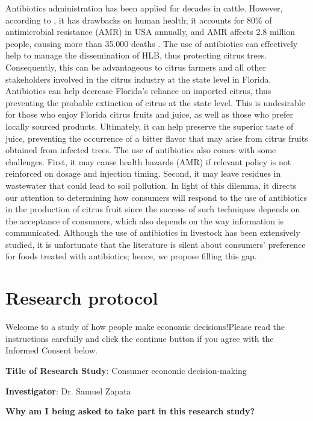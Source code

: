 \documentclass[12pt]{article}
\begin{document}
Antibiotics administration has been applied for decades in cattle. However, according to \citet{hosain_antimicrobial_2021}, it has drawbacks on human health; it accounts for 80\% of antimicrobial resistance (AMR) in USA annually, and AMR affects 2.8 million people, causing more than 35.000 deaths \citep{cdc2019antibiotic}.  The use of antibiotics can effectively help to manage the dissemination of HLB, thus protecting citrus trees. Consequently, this can be advantageous to citrus farmers and all other stakeholders involved in the citrus industry at the state level in Florida. Antibiotics can help decrease Florida's reliance on imported citrus, thus preventing the probable extinction of citrus at the state level. This is undesirable for those who enjoy Florida citrus fruits and juice, as well as those who prefer locally sourced products. Ultimately, it can help preserve the superior taste of juice, preventing the occurrence of a bitter flavor that may arise from citrus fruits obtained from infected trees. The use of antibiotics also comes with some challenges. First, it may cause health hazards (AMR) if relevant policy is not reinforced on dosage and injection timing. Second, it may leave  residues in wastewater that could lead to soil pollution. In light of this dilemma, it directs our attention to determining how consumers will respond to the use of antibiotics in the production of citrus fruit since the success of such techniques depends on the acceptance of consumers, which also depends on the way information is communicated. Although the use of antibiotics in livestock has been extensively studied, it is unfortunate that the literature is silent about consumers’ preference for foods treated with antibiotics; hence, we propose filling this gap.

\clearpage


        
\section{Research protocol}

Welcome to a study of how people make economic decisions!Please read the instructions carefully and click the continue button if you agree with the Informed Consent below.

\textbf{Title of Research Study}: Consumer economic decision-making

\textbf{Investigator}: Dr. Samuel Zapata

\textbf{Why am I being asked to take part in this research study?}
\end{document}
